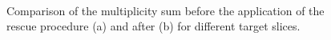 \begin{figure}[!h]
  \centering
	 \\
	\caption{Comparison of the multiplicity sum before the application  of the rescue procedure (a) and after (b) for different target slices.}
	\label{pic:Zvertexsum}
\end{figure}
